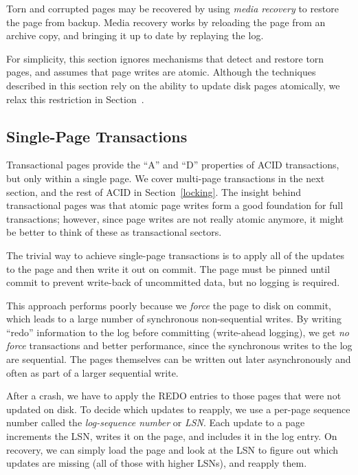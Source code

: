 \documentclass[letterpaper,twocolumn,10pt]{article}
\begin{document}
Torn and corrupted pages may be recovered by using {\em media
recovery} to restore the page from backup.  Media recovery works by
reloading the page from an archive copy, and bringing it up to date by
replaying the log.

For simplicity, this section ignores mechanisms that detect
and restore torn pages, and assumes that page writes are atomic.
Although the techniques described in this section rely on the ability to
update disk pages atomically, we relax this restriction in Section~\cite{sec:lsn-free}.

\subsection{Single-Page Transactions}

Transactional pages provide the ``A'' and ``D'' properties
of ACID transactions, but only within a single page.
We cover
multi-page transactions in the next section, and the rest of ACID in
Section~\ref{locking}.  The insight behind transactional pages was
that atomic page writes form a good foundation for full transactions;
however, since page writes are not really atomic anymore, it might be
better to think of these as transactional sectors.

The trivial way to achieve single-page transactions is to apply all of
the updates to the page and then write it out on commit.  The page
must be pinned until commit to prevent write-back of uncommitted data,
but no logging is required.

This approach performs poorly because we {\em force} the page to disk
on commit, which leads to a large number of synchronous non-sequential
writes.  By writing ``redo'' information to the log before committing
(write-ahead logging), we get {\em no force} transactions and better
performance, since the synchronous writes to the log are sequential.
The pages themselves can be written out later asynchronously and often
as part of a larger sequential write.

After a crash, we have to apply the REDO entries to those pages that
were not updated on disk.  To decide which updates to reapply, we use
a per-page sequence number called the {\em log-sequence number} or
{\em LSN}. Each update to a page increments the LSN, writes it on the
page, and includes it in the log entry.  On recovery, we can simply
load the page and look at the LSN to figure out which updates are missing
(all of those with higher LSNs), and reapply them.
\end{document}
